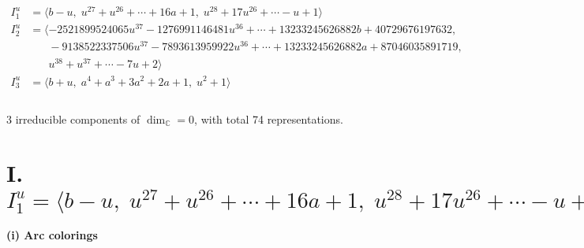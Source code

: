 \documentclass[1p]{elsarticle_modified}
\theoremstyle{definition}
\begin{document}
\begin{align*}
I^u_{1}&=\langle 
b- u,\;u^{27}+u^{26}+\cdots+16 a+1,\;u^{28}+17 u^{26}+\cdots- u+1\rangle \\
I^u_{2}&=\langle 
-2521899524065 u^{37}-1276991146481 u^{36}+\cdots+13233245626882 b+40729676197632,\\
\phantom{I^u_{2}}&\phantom{= \langle  }-9138522337506 u^{37}-7893613959922 u^{36}+\cdots+13233245626882 a+87046035891719,\\
\phantom{I^u_{2}}&\phantom{= \langle  }u^{38}+u^{37}+\cdots-7 u+2\rangle \\
I^u_{3}&=\langle 
b+u,\;a^4+a^3+3 a^2+2 a+1,\;u^2+1\rangle \\
\\
\end{align*}
\raggedright * 3 irreducible components of $\dim_{\mathbb{C}}=0$, with total 74 representations.\\
\newpage
\renewcommand{\arraystretch}{1}
\centering \section*{I. $I^u_{1}= \langle b- u,\;u^{27}+u^{26}+\cdots+16 a+1,\;u^{28}+17 u^{26}+\cdots- u+1 \rangle$}
\flushleft \textbf{(i) Arc colorings}\\
\end{document}
